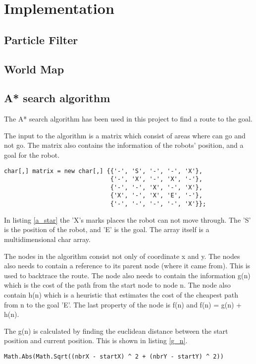 \chapter{Implementation}
\label{chp:impl}

\section{Particle Filter}
\section{World Map}
\section{A* search algorithm}

The A* search algorithm has been used in this project to find a route to the goal. 

The input to the algorithm is a matrix which consist of areas where  can go and not go. The matrix also contains the information of the robots' position, and a goal for the robot.

\begin{lstlisting}[caption={An example of the matrix which the A* uses as input.}, label=a_star]
char[,] matrix = new char[,] {{'-', 'S', '-', '-', 'X'},
							  {'-', 'X', '-', 'X', '-'},
							  {'-', '-', 'X', '-', 'X'},
							  {'X', '-', 'X', 'E', '-'},
							  {'-', '-', '-', '-', 'X'}};
\end{lstlisting}

In listing \ref{a_star} the 'X's marks places the robot can not move through. The 'S' is the position of the robot, and 'E' is the goal. The array itself is a multidimensional char array.

The nodes in the algorithm consist not only of coordinate x and y. The nodes also needs to contain a reference to its parent node (where it came from). This is used to backtrace the route. The node also needs to contain the information g(n) which is the cost of the path from the start node to node n. The node also contain h(n) which is a heuristic that estimates the cost of the cheapest path from n to the goal 'E'. The last property of the node is f(n) and f(n) = g(n) + h(n).

The g(n) is calculated by finding the euclidean distance between the start position and current position. This is shown in listing \ref{g_n}.

\begin{lstlisting}[caption={Calculation of g(n).}, label=g_n]
Math.Abs(Math.Sqrt((nbrX - startX) ^ 2 + (nbrY - startY) ^ 2))
\end{lstlisting}

